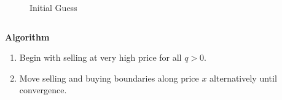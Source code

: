 \documentclass{beamer}
\begin{document}
\begin{frame}
\begin{columns}
{\begin{figure}[hbt]
  \caption{Initial Guess}
\end{figure}}
  \end{columns}
\end{frame}

\begin{frame}
{\bf Algorithm}
\begin{enumerate}
  \item Begin with selling at very high price for all $q>0$.
  \item Move selling and buying boundaries along price $x$ alternatively until convergence. 



\end{enumerate}

\end{frame}
\end{document}
